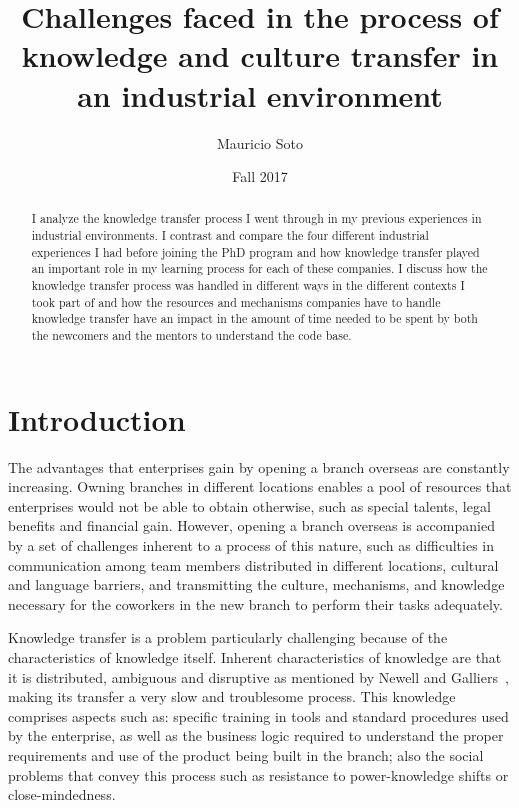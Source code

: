 \documentclass[12pt, letterpaper]{article}
\title{Challenges faced in the process of knowledge and culture transfer in an industrial environment}
\author{Mauricio Soto}
\date{Fall 2017}
\begin{document}
 
\begin{titlepage}
\maketitle
\end{titlepage}

\begin{abstract}
I analyze the knowledge transfer process I went through in my previous experiences in industrial environments.
I contrast and compare the four different industrial experiences I had before joining the PhD program and 
how knowledge transfer played an important role in my learning process for each of these companies.
I discuss how the knowledge transfer process was handled in different ways in the different contexts I took part
of and how the resources and mechanisms companies have to handle knowledge transfer have an impact in the 
amount of time needed to be spent by both the newcomers and the mentors to understand the code base.

 
\end{abstract}
 
 
\section{Introduction}

The advantages that enterprises gain by opening a branch overseas are constantly increasing.
Owning branches in different locations enables a pool of resources that enterprises would not be able
to obtain otherwise, such as special talents, legal benefits and financial gain. However, 
opening a branch overseas is accompanied by a set of challenges inherent to a process of this nature, such as 
difficulties in communication among team members distributed in different locations, 
cultural and language barriers, and transmitting the culture, mechanisms, and knowledge necessary for the 
coworkers in the new branch to perform their tasks adequately. 

Knowledge transfer is a problem particularly challenging because of the characteristics of
knowledge itself. Inherent characteristics of knowledge are that it is distributed, ambiguous and 
disruptive as mentioned by Newell and Galliers~\cite{Newell06}, making its transfer a very
slow and troublesome process. 
This knowledge comprises aspects such as: specific training in tools and standard procedures used by the enterprise, as well as the
business logic required to understand the proper requirements and use of the product being built
in the branch; also the social problems that convey this process such as resistance to power-knowledge
shifts or close-mindedness.
\end{document}
